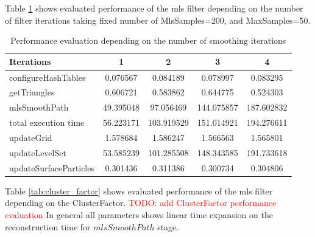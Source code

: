 Table \ref{tab:mls_iter_perf} shows evaluated performance of the mls filter depending on the number of filter iterations taking fixed number of MlsSamples=200, and MaxSamples=50.
\begin{table}[H]
	\begin{center}
		\scriptsize
		\begin{tabular}{|l|c|c|c|c|}
			\hline
			Iterations & 1 & 2 & 3 & 4 \\
			\hline
			configureHashTables     	& 0.076567	&	0.084189	& 0.078997		& 0.083295\\
			getTriangles    			& 0.606721	&	0.583862	& 0.644775		& 0.524303\\
			mlsSmoothPath   			& 49.395048	&	97.056469	& 144.075857	& 187.602832\\
			total execution time    	& 56.223171	&	103.919529	& 151.014921	& 194.276611\\
			updateGrid      			& 1.578684	&	1.586247	& 1.566563		& 1.565801\\
			updateLevelSet  			& 53.585239	&	101.285508	& 148.343585	& 191.733618\\
			updateSurfaceParticles  	& 0.301436	&	0.311386	& 0.300734		& 0.304806\\
			\hline
		\end{tabular}
	\end{center}
	\caption{Performance evaluation depending on the number of smoothing iterations}
	\label{tab:mls_iter_perf}
\end{table}

Table \ref{tab:cluster_factor} shows evaluated performance of the mls filter depending on the ClusterFactor.
\textcolor{red}{TODO: add ClusterFactor performance evaluation}
In general all parameters shows linear time expansion on the reconstruction time for $mlsSmoothPath$ stage.

